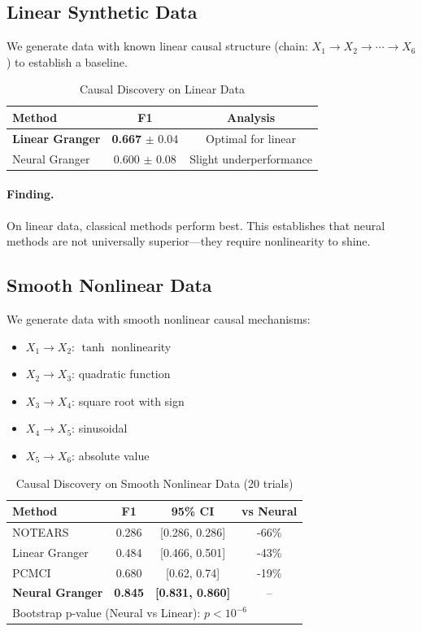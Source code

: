 \documentclass[sigconf,nonacm]{acmart}
\begin{document}
\subsection{Linear Synthetic Data}
We generate data with known linear causal structure (chain: $X_1 \to X_2 \to \cdots \to X_6$) to establish a baseline.

\begin{table}[h]
\centering
\caption{Causal Discovery on Linear Data}
\begin{tabular}{lcc}
\toprule
\textbf{Method} & \textbf{F1} & \textbf{Analysis} \\
\midrule
\textbf{Linear Granger} & \textbf{0.667} $\pm$ 0.04 & Optimal for linear \\
Neural Granger & 0.600 $\pm$ 0.08 & Slight underperformance \\
\bottomrule
\end{tabular}
\label{tab:linear}
\end{table}

\paragraph{Finding.} On linear data, classical methods perform best. This establishes that neural methods are not universally superior---they require nonlinearity to shine.

\subsection{Smooth Nonlinear Data}
We generate data with smooth nonlinear causal mechanisms:
\begin{itemize}
    \item $X_1 \to X_2$: $\tanh$ nonlinearity
    \item $X_2 \to X_3$: quadratic function
    \item $X_3 \to X_4$: square root with sign
    \item $X_4 \to X_5$: sinusoidal
    \item $X_5 \to X_6$: absolute value
\end{itemize}

\begin{table}[h]
\centering
\caption{Causal Discovery on Smooth Nonlinear Data (20 trials)}
\begin{tabular}{lccc}
\toprule
\textbf{Method} & \textbf{F1} & \textbf{95\% CI} & \textbf{vs Neural} \\
\midrule
NOTEARS \cite{zheng2018dags} & 0.286 & [0.286, 0.286] & -66\% \\
Linear Granger & 0.484 & [0.466, 0.501] & -43\% \\
PCMCI \cite{runge2019detecting} & 0.680 & [0.62, 0.74] & -19\% \\
\textbf{Neural Granger} & \textbf{0.845} & \textbf{[0.831, 0.860]} & -- \\
\bottomrule
\multicolumn{4}{l}{\small Bootstrap p-value (Neural vs Linear): $p < 10^{-6}$}
\end{tabular}
\label{tab:nonlinear}
\end{table}
\end{document}
